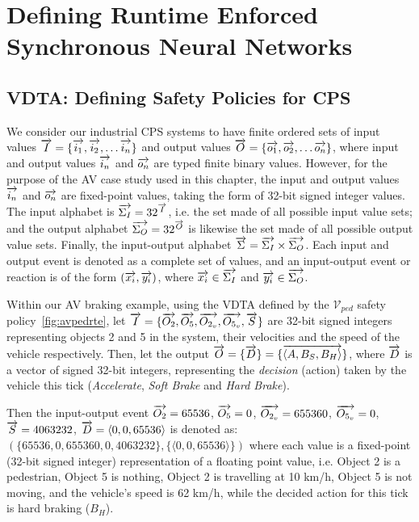 \section{Defining Runtime Enforced Synchronous Neural Networks}
\subsection{\ac{VDTA}: Defining Safety Policies for \ac{CPS}}

We consider our industrial \ac{CPS} systems to have finite ordered sets of input values $\overrightarrow{I} = \{\overrightarrow{i_1}, \overrightarrow{i_2}, \ldots \overrightarrow{i_n}\}$ and output values $\overrightarrow{O} = \{\overrightarrow{o_1}, \overrightarrow{o_2}, \ldots \overrightarrow{o_n}\}$, where input and output values $\overrightarrow{i_n}$ and $\overrightarrow{o_n}$ are typed finite binary values.
However, for the purpose of the \ac{AV} case study used in this chapter, the input and output values $\overrightarrow{i_n}$ and $\overrightarrow{o_n}$ are fixed-point values, taking the form of 32-bit signed integer values.
The input alphabet is $\overrightarrow{\Sigma_I} = 32^{\overrightarrow{I}}$, i.e. the set made of all possible input value sets; and the output alphabet $\overrightarrow{\Sigma_O} = 32^{\overrightarrow{O}}$ is likewise the set made of all possible output value sets.
Finally, the input-output alphabet $\overrightarrow{\Sigma} = \overrightarrow{\Sigma_I} \times \overrightarrow{\Sigma_O}$. 
Each input and output event is denoted as a complete set of values, and an input-output event or reaction is of the form $(\overrightarrow{x_i}, \overrightarrow{y_i})$, where $\overrightarrow{x_i} \in \overrightarrow{\Sigma_I}$ and $\overrightarrow{y_i} \in \overrightarrow{\Sigma_O}$. 

\begin{example}
	\label{ex:io}
	Within our \ac{AV} braking example, using the \ac{VDTA} defined by the $\mathcal{V}_{ped}$ safety policy~\ref{fig:avpedrte}, let $\overrightarrow{I} = \{\overrightarrow{O_2}, \overrightarrow{O_5}, \overrightarrow{O_{2_v}}, \overrightarrow{O_{5_v}}, \overrightarrow{S}\}$ are 32-bit signed integers representing objects 2 and 5 in the system, their velocities and the speed of the vehicle respectively.
	Then, let the output $\overrightarrow{O} = \{\overrightarrow{D}\} = \{\overrightarrow{\langle A, B_S, B_H \rangle}\}$, where $\overrightarrow{D}$ is a vector of signed 32-bit integers, representing the \textit{decision} (action) taken by the vehicle this tick (\textit{Accelerate}, \textit{Soft Brake} and \textit{Hard Brake}).
	
	Then the input-output event $\overrightarrow{O_2}=65536$, $\overrightarrow{O_5}=0$, $\overrightarrow{O_{2_v}} = 655360$, $\overrightarrow{O_{5_v}} = 0$,  $\overrightarrow{S} = 4063232$, $\overrightarrow{D} = \langle 0, 0, 65536 \rangle$ is denoted as:\\$(\{65536, 0, 655360, 0, 4063232\}, \{\langle 0, 0, 65536 \rangle\})$ where each value is a fixed-point (32-bit signed integer) representation of a floating point value, i.e. Object 2 is a pedestrian, Object 5 is nothing, Object 2 is travelling at 10 km/h, Object 5 is not moving, and the vehicle's speed is 62 km/h, while the decided action for this tick is hard braking ($B_H$).
\end{example}

